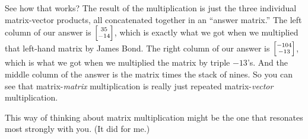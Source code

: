 See how that works? The result of the multiplication is just the three
individual matrix-vector products, all concatenated together in an ``answer
matrix.'' The left column of our answer is ${\scriptsize \begin{bmatrix} 35 \\
-14 \\ \end{bmatrix}}$, which is exactly what we got when we multiplied that
left-hand matrix by James Bond. The right column of our answer is ${\scriptsize
\begin{bmatrix} -104 \\ -13 \\ \end{bmatrix}}$, which is what we got when we
multiplied the matrix by triple $-13$'s. And the middle column of the answer is
the matrix times the stack of nines. So you can see that matrix-\textit{matrix}
multiplication is really just repeated matrix-\textit{vector} multiplication.

This way of thinking about matrix multiplication might be the one that
resonates most strongly with you. (It did for me.)


